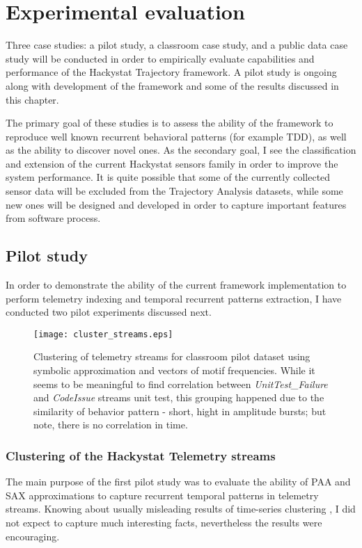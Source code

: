 \chapter{Experimental evaluation} \label{experiments}
Three case studies: a pilot study, a classroom case study, and a public data case study will be conducted in order to empirically evaluate capabilities and performance of the Hackystat Trajectory framework. A pilot study is ongoing along with development of the framework and some of the results discussed in this chapter.

The primary goal of these studies is to assess the ability of the framework to reproduce well known recurrent behavioral patterns (for example TDD), as well as the ability to discover novel ones. As the secondary goal, I see the classification and extension of the current Hackystat sensors family in order to improve the system performance. It is quite possible that some of the currently collected sensor data will be excluded from the Trajectory Analysis datasets, while some new ones will be designed and developed in order to capture important features from software process. 

\section{Pilot study}\label{pilot.evaluation}
In order to demonstrate the ability of the current framework implementation to perform telemetry indexing and temporal recurrent patterns extraction, I have conducted two pilot experiments discussed next. 

\begin{figure}[tbp]
   \centering
   \texttt{[image: cluster\_streams.eps]}
   \caption{Clustering of telemetry streams for classroom pilot dataset using symbolic approximation and vectors of motif frequencies. While it seems to be meaningful to find correlation between \textit{UnitTest\_Failure} and \textit{CodeIssue} streams unit test, this grouping happened due to the similarity of behavior pattern - short, hight in amplitude bursts; but note, there is no correlation in time.}
   \label{fig:cluster_streams}
\end{figure}

\subsection{Clustering of the Hackystat Telemetry streams}
The main purpose of the first pilot study was to evaluate the ability of PAA and SAX approximations to capture recurrent temporal patterns in telemetry streams. Knowing about usually misleading results of time-series clustering \cite{citeulike:227029}, I did not expect to capture much interesting facts, nevertheless the results were encouraging.

